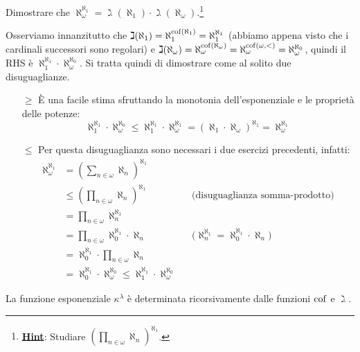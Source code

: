 \begin{exercise}
	Dimostrare che $\aleph_\omega^{\aleph_1} = \gimel(\aleph_1) \cdot \gimel(\aleph_\omega)$.\footnote{\underline{\textbf{Hint}}: Studiare $\left(\prod_{n \in \omega} \aleph_n\right)^{\aleph_1}$.}
\end{exercise}

\begin{soln}
	Osserviamo innanzitutto che $\gimel(\aleph_1) = \aleph_1^{\operatorname{cof}(\aleph_1)} = \aleph_1^{\aleph_1}$ (abbiamo appena visto che i cardinali successori sono regolari) e $\gimel(\aleph_\omega) = \aleph_{\omega}^{\operatorname{cof}(\aleph_{\omega})} = \aleph_{\omega}^{\operatorname{cof}(\omega,<)} = \aleph_\omega^{\aleph_0}$,
	quindi il RHS è $\aleph_1^{\aleph_1} \cdot \aleph_\omega^{\aleph_0}$. Si tratta quindi di dimostrare come al solito due disuguaglianze.
	\begin{itemize}
		\item[$\boxed{\geq}$] È una facile stima sfruttando la monotonia dell'esponenziale e le proprietà delle potenze:
		\[ \aleph_1^{\aleph_1}\cdot \aleph_\omega^{\aleph_0} \leq \aleph_1^{\aleph_1}\cdot \aleph_\omega^{\aleph_1} = (\aleph_1 \cdot \aleph_\omega)^{\aleph_1} = \aleph_\omega^{\aleph_1}
			\] 
		\item[$\boxed{\leq}$] Per questa disuguaglianza sono necessari i due esercizi precedenti, infatti:
		\begin{align*}
			\aleph_\omega^{\aleph_1} &= \left(\sum_{n \in \omega} \aleph_n\right)^{\aleph_1} \\
									 &\leq \left(\prod_{n \in \omega} \aleph_n\right)^{\aleph_1} &&\text{(disuguaglianza somma-prodotto)} \\
									 &= \prod_{n \in \omega}\aleph_n^{\aleph_1} \\
									 &= \prod_{n \in \omega} \aleph_0^{\aleph_1} \cdot \aleph_n &&\text{($\aleph_n^{\aleph_1} = \aleph_0^{\aleph_1}\cdot\aleph_n$)} \\
									 &= \aleph_0^{\aleph_1} \cdot \prod_{n \in \omega} \aleph_n \\
									 &= \aleph_0^{\aleph_1} \cdot \aleph_\omega^{\aleph_0} \leq \aleph_1^{\aleph_1} \cdot \aleph_\omega^{\aleph_0}
		\end{align*}
	\end{itemize}
\end{soln}

\begin{fact}
	La funzione esponenziale $\kappa^\lambda$ è determinata ricorsivamente dalle funzioni $\operatorname{cof}$ e $\gimel$.
\end{fact}

